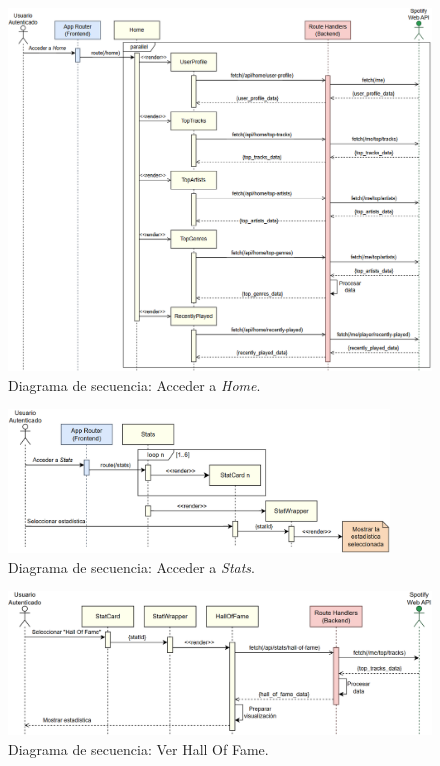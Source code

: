 \begin{figure}[H]
    \centering
    \includegraphics[width=\textwidth]{figures/diagramas_secuencia/ds_acceder_home.png}
    \caption{Diagrama de secuencia: Acceder a \textit{Home}.}
    \label{fig:ds_acceder_home}
\end{figure}

\begin{figure}[H]
    \centering
    \includegraphics[width=0.9\textwidth]{figures/diagramas_secuencia/ds_acceder_stats.png}
    \caption{Diagrama de secuencia: Acceder a \textit{Stats}.}
    \label{fig:ds_acceder_stats}
\end{figure}

\begin{figure}[H]
    \centering
    \includegraphics[width=\textwidth]{figures/diagramas_secuencia/ds_ver_hall_of_fame.png}
    \caption{Diagrama de secuencia: Ver Hall Of Fame.}
    \label{fig:ds_ver_hall_of_fame}
\end{figure}

